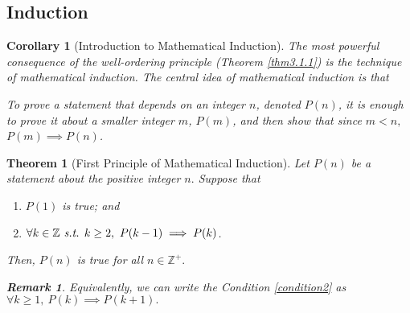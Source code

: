 \documentclass[12pt,a4paper]{article}
\newtheorem{thm}{Theorem}[subsection]
\newtheorem{cor}{Corollary}[subsection]
\newtheorem*{rmk}{\indent Remark}
\def\Z{{\mathbb{Z}}}
\def\Zp{{\Z^{+}}}
\def\st{\emph{ s.t. }}
\begin{document}
\subsection{Induction}
\begin{cor}[Introduction to Mathematical Induction]
	The most powerful consequence of the well-ordering	principle (Theorem \ref{thm3.1.1}) is the technique of mathematical induction. The central idea of mathematical induction is that \begin{center}\textit{To prove a statement that depends on an integer $n$, denoted $P(n)$, it is enough to prove it about a smaller integer $m$, $P(m)$, and then show that since $m<n,$ $P(m)\implies P(n)$.}\end{center}
\end{cor}
\begin{thm}[First Principle of Mathematical Induction]\label{induction}
	Let $P(n)$ be a statement about the positive integer $n.$ Suppose that 
	\begin{enumerate}
		\item $P(1)$ is true; and 
		\item\label{condition2} $\forall k\in\Z\st k\geq2,\ P(k-1)\implies P(k)$.
	\end{enumerate}	Then, $P(n)$ is true for all $n\in\Zp.$
	\begin{rmk} Equivalently, we can write the Condition \ref{condition2} as $\forall k\geq1,\ P(k)\implies P(k+1).$ \end{rmk}
\end{thm}
\end{document}
